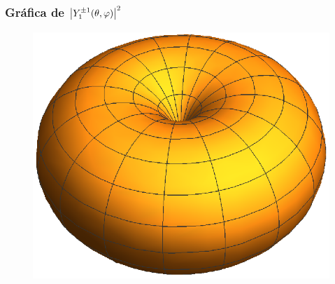 \documentclass[12pt]{beamer}
\begin{document}
\begin{frame}
\frametitle{Gráfica de $\abs{Y_{1}^{\pm 1} (\theta, \varphi)}^{2}$}
\begin{figure}
    \centering
    \includegraphics[scale=0.8]{Imagenes/AE2_11.eps}
\end{figure}
\end{frame}
\end{document}
